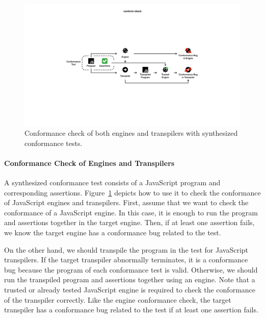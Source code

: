\begin{figure}
  \includegraphics[width=\textwidth]{img/conform-check}
  \caption{
    Conformance check of both engines and transpilers with synthesized
    conformance tests.
  }
  \label{fig:conform-check}
\end{figure}


\paragraph{\textbf{Conformance Check of Engines and Transpilers}}
%
A synthesized conformance test consists of a JavaScript program and
corresponding assertions.
%
Figure~\ref{fig:conform-check} depicts how to use it to check the conformance of
JavaScript engines and transpilers.
%
First, assume that we want to check the conformance of a JavaScript engine.
%
In this case, it is enough to run the program and assertions together in the
target engine.
%
Then, if at least one assertion fails, we know the target engine has a
conformance bug related to the test.

On the other hand, we should transpile the program in the test for JavaScript
transpilers.
%
If the target transpiler abnormally terminates, it is a conformance bug because
the program of each conformance test is valid.
%
Otherwise, we should run the transpiled program and assertions together using an
engine.
%
Note that a trusted or already tested JavaScript engine is required to check the
conformance of the transpiler correctly.
%
Like the engine conformance check, the target transpiler has a conformance bug
related to the test if at least one assertion fails.
